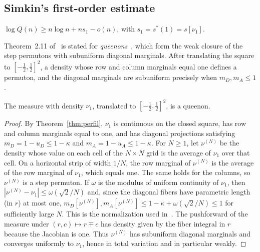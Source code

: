 \subsection{Simkin's first-order estimate}

\begin{teorema}\label{thm:simkin}
$\log Q(n)\ge n\log n+ns_1-o(n)$, with $s_1=s^*(1)=s[\nu_1]$. \end{teorema}

Theorem~2.11 of~\cite{Simkin} is stated for \emph{queenons}~\cite[Definitions~2.1, 2.3 and~2.4]{Simkin},
which form the weak closure of
the step permutons with subuniform diagonal marginals. After translating the square to
$[-\frac12,\frac12]^2$, a density whose row and
column marginals equal one defines a permuton, and the diagonal marginals are subuniform precisely when
$m_D,m_A\le1$.

\begin{lema}\label{lem:queenon} The measure with density $\nu_1$, translated to $[-\frac12,\frac12]^2$, is a
queenon. \end{lema}

\begin{proof} By Theorem~\ref{thm:perfil}, $\nu_1$ is continuous on the closed square, has row and column
marginals equal to one, and
has diagonal projections satisfying $m_D=1-u_D\le1-\kappa$ and $m_A=1-u_A\le1-\kappa$. For $N\ge1$, let
$\nu^{(N)}$ be the density
whose value on each cell of the $N\times N$ grid is the average of $\nu_1$ over that cell. On a horizontal
strip of width $1/N$, the
row marginal of $\nu^{(N)}$ is the average of the row marginal of $\nu_1$, which equals one. The same holds
for the columns, so
$\nu^{(N)}$ is a step permuton. If $\omega$ is the modulus of uniform continuity of $\nu_1$, then
$|\nu^{(N)}-\nu_1|\le\omega(\sqrt2/N)$ and, since the diagonal fibers have parametric length (in $r$) at
most one,
$m_D[\nu^{(N)}],m_A[\nu^{(N)}]\le1-\kappa+\omega(\sqrt2/N)\le1$ for sufficiently large $N$. This is the
normalization used
in~\cite{Simkin}. The pushforward of the measure under $(r,c)\mapsto r\mp c$ has density given by the fiber
integral in $r$ because the
Jacobian is one. Thus $\nu^{(N)}$ has subuniform diagonal marginals and converges uniformly to $\nu_1$,
hence in total variation and in
particular weakly. \end{proof}

